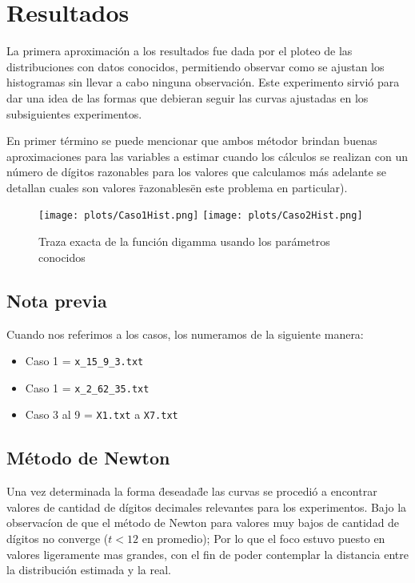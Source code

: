 \section{Resultados}

La primera aproximaci\'on a los resultados fue dada por el ploteo de las 
distribuciones con datos conocidos, permitiendo observar como se ajustan los 
histogramas sin llevar a cabo ninguna observaci\'on. 
Este experimento sirvi\'o para dar una idea de las formas que debieran seguir 
las curvas ajustadas en los subsiguientes experimentos.

En primer t\'ermino se puede mencionar que ambos m\'etodor brindan buenas
aproximaciones para las variables a estimar cuando los c\'alculos se realizan
con un n\'umero de d\'igitos razonables para los valores que calculamos m\'as
adelante se detallan cuales son valores \"razonables\" en este problema en
particular).
\begin{figure} [H]
\begin {center}
\texttt{[image: plots/Caso1Hist.png]}
\texttt{[image: plots/Caso2Hist.png]}
\end {center}
\caption{Traza exacta de la funci\'on digamma usando los par\'ametros conocidos}
\label{fig:FitCaso3Newton}
\end{figure}

\subsection{Nota previa}
Cuando nos referimos a los casos, los numeramos de la siguiente manera:\\
\begin{itemize}
    \item Caso 1 = \texttt{x\_15\_9\_3.txt}
    \item Caso 1 = \texttt{x\_2\_62\_35.txt}
    \item Caso 3 al 9 = \texttt{X1.txt} a \texttt{X7.txt}
\end{itemize}


\subsection{M\'etodo de Newton}

Una vez determinada la forma \"deseada\" de las curvas se procedi\'o a encontrar
valores de cantidad de d\'igitos decimales relevantes para los experimentos. 
Bajo la observac\'ion de que el m\'etodo de Newton para valores muy bajos de 
cantidad de d\'igitos no converge ($t < 12$ en promedio); Por lo que el foco
estuvo puesto en valores ligeramente mas grandes, con el fin de poder contemplar
la distancia entre la distribuci\'on estimada y la real.

